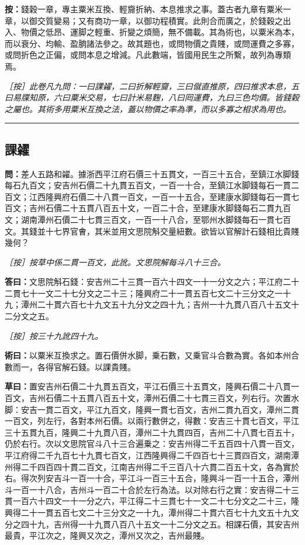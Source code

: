 \documentclass[11pt,a4paper]{article}
\newcommand{\longline}{\noindent\rule{\textwidth}{0.4pt}}
\newcommand{\Question}[1]{\par\noindent\textbf{\color{problemcolor}問：}#1\par}
\newcommand{\Answer}[1]{\par\noindent\textbf{\color{answercolor}答曰：}#1\par}
\newcommand{\Method}[1]{\par\noindent\textbf{\color{methodcolor}術曰：}#1\par}
\newcommand{\Working}[1]{\par\noindent\textbf{草曰：}#1\par}
\newcommand{\EditorialNote}[1]{\par\noindent\textit{［按］#1}\par}
\begin{document}
\noindent\textbf{按：}錢穀一章，專主粟米互換、輕齎折納、本息推求之事。蓋古者九章有粟米一章，以御交質變易；又有商功一章，以御功程積實。此則合而廣之，於錢穀之出入、物價之低昂、運脚之輕重、折變之煩簡，無不備載。其為術也，以粟米為本，而以衰分、均輸、盈朒諸法參之。故其題也，或問物價之貴賤，或問運費之多寡，或問折色之正偏，或問本息之增減。凡此數端，皆國用民生之所繫，故列為專類焉。

\EditorialNote{此卷凡九問：一曰課糴，二曰折解輕齎，三曰僦直推原，四曰推求本息，五曰易牒知原，六曰粟米交易，七曰計米易麴，八曰囘運費，九曰三色均價。皆錢穀之屬也。其術多用粟米互換之法，蓋以物價之率為準，而以多寡之相求為用也。}

\longline

\subsection*{\color{sectioncolor}課糴}

\Question{差人五路和糴。據浙西平江府石價三十五貫文，一百三十五合，至鎮江水脚錢每石九百文；安吉州石價二十九貫五百文，一百一十合，至鎮江水脚錢每石一貫二百文；江西隆興府石價二十八貫一百文，一百一十五合，至建康水脚錢每石一貫七百文；吉州石價二十五貫八百五十文，一百二十合，至建康水脚錢每石二貫九百文；湖南潭州石價二十七貫三百文，一百一十八合，至鄂州水脚錢每石一貫七百文。其錢並十七界官㑹，其米並用文思院斛交量紐數。欲皆以官解計石錢相比貴賤幾何？}

\EditorialNote{按草中係二貫一百文，此訛。文思院解每斗八十三合。}

\Answer{文思院斛石錢：安吉州二十三貫一百六十四文一十一分文之六；平江府二十二貫七十一文二十七分文之二十三；隆興府二十一貫五百七文二十三分文之一十九；潭州二十貫六百七十九文五十九分文之四十九；吉州一十九貫八百八十五文十二分文之五。}

\EditorialNote{按三十九訛四十九。}

\Method{以粟米互換求之。置石價併水脚，乗石數，又乗官斗合數為實。各如本州合數而一，各得官解石錢。以課貴賤。}

\Working{置安吉州石價二十九貫五百文，平江石價三十五貫文，隆興石價二十八貫一百文，吉州石價二十五貫八百五十文，潭州石價二十七貫三百文，列右行。次置水脚：安吉一貫二百文，平江九百文，隆興一貫七百文，吉州二貫九百文，潭州二貫一百文，列左行，各對本州石價。以兩行數併之，得數：安吉三十貫七百文，平江三十五貫九百，隆興二十九貫八百，潭州二十九貫四百，吉州二十八貫七百五十，仍於右行。次以文思院官斗八十三合遍乗之：安吉州得二千五百四十八貫一百文，平江府得二千九百七十九貫七百文，江西隆興得二千四百七十三貫四百文，湖南潭州得二千四百四十貫二百文，江南吉州得二千三百八十六貫二百五十文，各為實於右。得次列安吉斗一百一十合，平江斗一百三十五合，隆興斗一百一十五合，潭州斗一百一十八合，吉州斗一百二十合於左行為法。以对除右行之實：安吉得二十三貫一百六十四文一十一分之六，平江得二十三貫七十一文二十七分文之二十三，隆興得二十一貫五百七文二十三分文之一十九，潭州得二十貫六百七十九文五十九文分之四十九，吉州得一十九貫八百八十五文一十二分文之五。相課石價，其安吉州最貴，平江次之，隆興又次之，潭州又次之，吉州最賤。}
\end{document}
